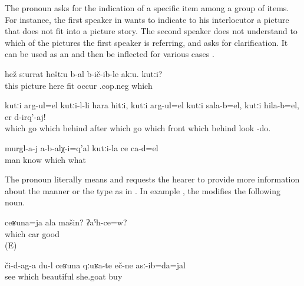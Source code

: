The pronoun  asks for the indication of a specific item among a group of items. For instance, the first speaker in  wants to indicate to his interlocutor a picture that does not fit into a picture story. The second speaker does not understand to which of the pictures the first speaker is referring, and asks for clarification. It can be used as an  and then be inflected for various cases .
%
\begin{exe}
	\ex	\label{ex:This picture does not fit here. Which}
	\gll	hež	sːurrat	heštːu	b-al	b-ič-ib-le	akːu. kutːi?\\
		this	picture	here	\tsc{n-}fit	occur	\tsc.{cop.neg}	which\\
	\glt	{}

	\ex	\label{ex:Which (picture) goes behind which, which goes in front, which goes behind, take a look}
	\gll	kutːi	arg-ul=el	kutːi-l-li	hara	hitːi,	kutːi	arg-ul=el kutːi	sala-b=el,	kutːi	hila-b=el,		er d-irq'-aj!\\
		which	go	which	behind	after	which	go	which	front\tsc{-n=indq}		which	behind		look -do.\\
	\glt	{}

	\ex	\label{ex:The men did not know which was whose}
	\gll	murgl-a-j	a-b-alχ-i=q'al	kutːi-la	ce	ca-d=el\\
		man	know	which	what	\\
	\glt	{}
\end{exe}

The pronoun  literally means  and requests the hearer to provide more information about the manner or the type as in . In example , the  modifies the following noun.
%
\begin{exe}
	\ex	\label{ex:How is your car? Is it good?}
	\gll	ceʁuna=ja	ala	mašin?		ʡaˁħ-ce=w?\\
		which		car	good\\
	\glt	{} (E)

	\ex	\label{ex:Look what beautiful goats I bought}
	\gll	či-d-ag-a	du-l	ceʁuna	qːuʁa-te	eč-ne	asː-ib=da=jal\\
		see		which	beautiful 	she.goat	buy\\
	\glt	{}
\end{exe}


